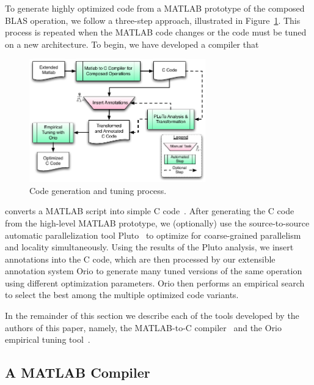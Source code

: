 \documentclass[runningheads]{llncs}
\begin{document}
To generate highly optimized code from a MATLAB prototype of the composed
BLAS operation, we follow a three-step approach, illustrated in
Figure~\ref{fig:process}.  This process is repeated when the MATLAB code changes
or the code must be tuned on a new architecture.
To begin, we have developed a compiler that
%
\begin{figure}
\vspace{-.2in}
\centering
\includegraphics[width=3in]{figures/process.pdf}
\vspace{-.15in}
\caption{Code generation and tuning process.}
\label{fig:process}
\vspace{-.1in}
\end{figure}
%
converts a MATLAB script into simple C code~\cite{Siek}.  After generating
the C code from the high-level MATLAB prototype, we (optionally) use 
the source-to-source automatic parallelization tool Pluto~\cite{Pluto} %
to optimize for coarse-grained parallelism and locality simultaneously. Using
the results of the Pluto analysis, we insert annotations into the C code,
which are then processed by our extensible annotation system Orio to generate
many tuned versions of the same operation using different optimization
parameters. Orio then performs an empirical search to select the best among
the multiple optimized code variants.


In the remainder of this section we describe each of the tools developed by
the authors of this paper, namely, the MATLAB-to-C compiler~\cite{Siek} and the Orio
empirical tuning tool~\cite{Norris:2007,Hartono:IPDPS09}.

\subsection{A MATLAB Compiler}
\label{sec:matlab}
\end{document}

